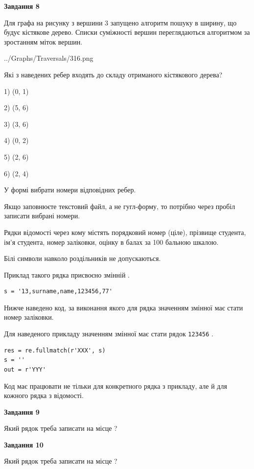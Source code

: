 \documentclass[12pt, ukrainian]{article}
\def\code#1{\Verb!#1!}
\begin{document}
{\begin {large}
{\begin {center}\textbf{Завдання 8}\end {center}}\par
Для графа на рисунку з вершини 3 запущено алгоритм пошуку в ширину, що будує кістякове дерево. Списки суміжності вершин переглядаються алгоритмом за зростанням міток вершин.\par
\begin{center}
	{../Graphs/Traversals/316.png}
\end{center}
\par Які з наведених ребер входять до складу отриманого кістякового дерева?\par
1) (0, 1)\par
2) (5, 6)\par
3) (3, 6)\par
4) (0, 2)\par
5) (2, 6)\par
6) (2, 4)\par
{\vskip 15pt} У формі вибрати номери відповідних ребер.


Якщо заповнюєте текстовий файл, а не гугл-форму, то потрібно через пробіл записа\-ти вибрані номери.\par
\newpage


Рядки відомості через кому містять порядковий номер (ціле), пріз\-ви\-ще студен\-та, ім'я студента, номер заліковки, оцінку в балах за 100 бальною шкалою.

Білі символи навколо роздільників не допускаються.

Приклад такого рядка присвоєно змінній .



\begin{verbatim}
s = '13,surname,name,123456,77'
\end{verbatim}


Нижче наведено код, за виконання якого для рядка  значенням змінної  має стати номер заліковки.

Для наведеного прикладу значенням змінної  має стати рядок \code{123456} .



\begin{verbatim}
res = re.fullmatch(r'XXX', s)
s = ''
out = r'YYY'
\end{verbatim}


Код має працювати не тільки для конкретного рядка з прикладу, але й для кожного рядка з відомості.

{\begin {center}\textbf{Завдання 9}\end {center}}\par
Який рядок треба записати на місце  ?\par
\vspace{5mm}


{\begin {center}\textbf{Завдання 10}\end {center}}\par
Який рядок треба записати на місце  ?\par


\newpage


\end {large}}
\end{document}
